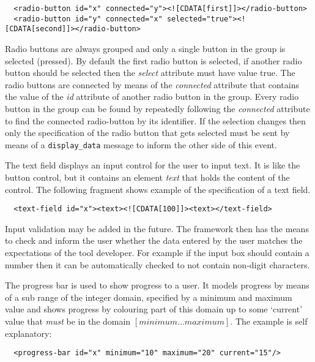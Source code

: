 \documentclass{article}
\newcommand{\msg}[1]{\texttt{#1}}
\begin{document}
    \small \begin{verbatim}
  <radio-button id="x" connected="y"><![CDATA[first]]></radio-button>
  <radio-button id="y" connected="x" selected="true"><![CDATA[second]]></radio-button>\end{verbatim}
  \normalsize

   \noindent Radio buttons are always grouped and only a single button in the
   group is selected (pressed).  By default the first radio button is selected,
   if another radio button should be selected then the \textit{select}
   attribute must have value true. The radio buttons are connected by means of
   the \textit{connected} attribute that contains the value of the \textit{id}
   attribute of another radio button in the group. Every radio button in the
   group can be found by repeatedly following the \textit{connected} attribute
   to find the connected radio-button by its identifier. If the selection
   changes then only the specification of the radio button that gets selected
   must be sent by means of a \msg{display\_data} message to inform the other
   side of this event.

   The text field displays an input control for the user to input text. It is
   like the button control, but it contains an element \textit{text} that
   holds the content of the control. The following fragment shows example of
   the specification of a text field.
   
   \small \begin{verbatim}
  <text-field id="x"><text><![CDATA[100]]><text></text-field>\end{verbatim}
  \normalsize

   Input validation may be added in the future. The framework then has the means
   to check and inform the user whether the data entered by the user matches
   the expectations of the tool developer.  For example if the input box should
   contain a number then it can be automatically checked to not contain
   non-digit characters.

   The progress bar is used to show progress to a user. It models progress by
   means of a sub range of the integer domain, specified by a minimum and
   maximum value and shows progress by colouring part of this domain up to some
   `current' value that \emph{must} be in the domain $[ minimum \ldots
   maximum ]$. The example is self explanatory:

   \small \begin{verbatim}
  <progress-bar id="x" minimum="10" maximum="20" current="15"/>\end{verbatim}
  \normalsize
\end{document}
